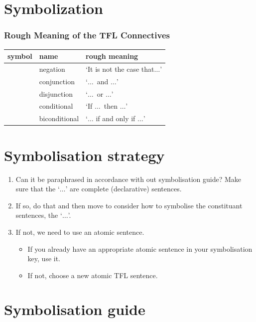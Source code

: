 \vspace*{2cm}
\section{Symbolization}
\subsubsection*{Rough Meaning of the TFL Connectives}
		\begin{tabular}{cll}
		\textbf{symbol}&\textbf{name}&\textbf{rough meaning}\\
		\hline
		\enot&negation&`It is not the case that$\ldots$'\\
		\eand&conjunction&`$\ldots$\ and $\ldots$'\\
		\eor&disjunction&`$\ldots$\ or $\ldots$'\\
		\eif&conditional&`If $\ldots$\ then $\ldots$'\\
		\eiff&biconditional&`$\ldots$ if and only if $\ldots$'\\
		\end{tabular}
		
		


\section{Symbolisation strategy}\label{appendix:quickref:symbolization}

\begin{enumerate}
	\item Can it be paraphrased in accordance with out symbolisation guide?
	Make sure that the `$\ldots$' are complete (declarative) sentences. 
	\item If so, do that and then move to consider how to symbolise the constituant sentences, the `$\ldots$'.
	\item If not, we need to use an atomic sentence.  
	\begin{itemize}
		\item If you already have an appropriate atomic sentence in your symbolisation key, use it.
		\item If not, choose a new atomic TFL sentence. 
	\end{itemize}
\end{enumerate}


\section{Symbolisation guide}

